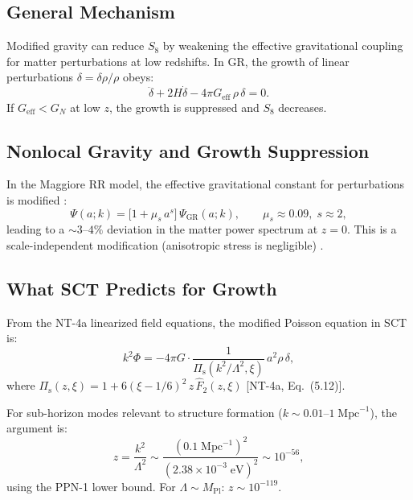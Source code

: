 \documentclass[11pt,a4paper]{article}
\theoremstyle{plain}
\theoremstyle{definition}
\theoremstyle{remark}
\newcommand{\fromlit}[1]{\textcolor{blue!70!black}{\textsf{[#1]}}}
\begin{document}
\subsection{General Mechanism}

Modified gravity can reduce $S_8$ by weakening the effective
gravitational coupling for matter perturbations at low redshifts. In
GR, the growth of linear perturbations $\delta = \delta\rho/\rho$
obeys:
\begin{equation}\label{eq:growth-GR}
  \ddot{\delta} + 2H\dot{\delta} - 4\pi G_{\mathrm{eff}}\,\rho\,\delta = 0.
\end{equation}
If $G_{\mathrm{eff}} < G_N$ at low $z$, the growth is suppressed and
$S_8$ decreases.

\subsection{Nonlocal Gravity and Growth Suppression}

In the Maggiore RR model, the effective gravitational constant for
perturbations is modified \cite{Dirian14}:
\begin{equation}
  \Psi(a;k) = \bigl[1 + \mu_s\,a^s\bigr]\,\Psi_{\mathrm{GR}}(a;k),
  \qquad \mu_s \approx 0.09,\; s \approx 2,
\end{equation}
leading to a $\sim 3\text{--}4\%$ deviation in the matter power spectrum
at $z = 0$. This is a scale-independent modification (anisotropic stress
is negligible) \cite{Dirian14}.

\subsection{What SCT Predicts for Growth}

From the NT-4a linearized field equations, the modified Poisson equation
in SCT is:
\begin{equation}\label{eq:poisson-sct}
  k^2\Phi = -4\pi G \cdot \frac{1}{\Pi_{\mathrm{s}}(k^2/\Lambda^2,\xi)}\,
  a^2\rho\,\delta,
\end{equation}
where $\Pi_{\mathrm{s}}(z,\xi) = 1 + 6(\xi - 1/6)^2\,z\,\hat{F}_2(z,\xi)$
\fromlit{NT-4a, Eq.~(5.12)}.

For sub-horizon modes relevant to structure formation ($k \sim 0.01
\text{--}1\;\text{Mpc}^{-1}$), the argument is:
\begin{equation}
  z = \frac{k^2}{\Lambda^2} \sim
  \frac{(0.1\;\text{Mpc}^{-1})^2}{(2.38 \times 10^{-3}\;\text{eV})^2}
  \sim 10^{-56},
\end{equation}
using the PPN-1 lower bound. For $\Lambda \sim M_{\mathrm{Pl}}$:
$z \sim 10^{-119}$.
\end{document}
